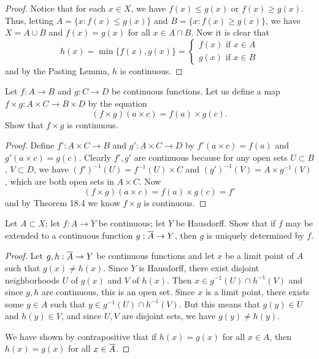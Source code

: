 \documentclass[11pt]{article}
\begin{document}
\begin{proof}
  Notice that for each $x \in X$, we have $f(x) \leq g(x)$ or $f(x) \geq g(x)$.
  Thus, letting $A = \{x: f(x) \leq g(x)\}$ and $B = \{x: f(x) \geq g(x)\}$,
  we have $X = A \cup B$ and $f(x) = g(x)$ for all $x \in A \cap B$. Now it is
  clear that
  \[
    h(x) = \min\{f(x), g(x)\} =
      \begin{cases}
        f(x) \text{ if } x \in A \\
        g(x) \text{ if } x \in B
      \end{cases}
  \]
  and by the Pasting Lemma, $h$ is continuous.
\end{proof}

\begin{ex}{18.10}
  Let $f: A \to B$ and $g: C \to D$ be continuous functions. Let us define a map
  $f \times g : A \times C \to B \times D$ by the equation
  \[ (f \times g)(a \times c) = f(a) \times g(c). \]
  Show that $f \times g$ is continuous.
\end{ex}

\begin{proof}
  Define $f': A \times C \to B$ and $g': A \times C \to D$ by $f'(a \times c) =
  f(a)$ and $g'(a \times c) = g(c)$. Clearly $f', g'$ are continuous because for
  any open sets $U \subset B$, $V \subset D$, we have $(f')^{-1}(U) = f^{-1}(U)
  \times C$ and $(g')^{-1}(V) = A \times g^{-1}(V)$, which are both open sets in
  $A \times C$. Now
  \[ (f \times g)(a \times c) = f(a) \times g(c) = f' \]
  and by Theorem 18.4 we know $f \times g$ is continuous.
\end{proof}

\begin{ex}{18.13}
  Let $A \subset X$; let $f : A \to Y$ be continuous; let $Y$ be Hausdorff. Show
  that if $f$ may be extended to a continuous function $g : { \overline{A} } \to Y$, then
  $g$ is uniquely determined by $f$.
\end{ex}

\begin{proof}
  Let $g, h: { \overline{A} } \to Y$ be continuous functions and let $x$ be a limit point
  of $A$ such that $g(x) \neq h(x)$. Since $Y$ is Hausdorff, there exist
  disjoint neighborhoods $U$ of $g(x)$ and $V$ of $h(x)$. Then $x \in g^{-1}(U)
  \cap h^{-1}(V)$ and since $g, h$ are continuous, this is an open set. Since
  $x$ is a limit point, there exists some $y \in A$ such that $y \in g^{-1}(U)
  \cap h^{-1}(V)$. But this means that $g(y) \in U$ and $h(y) \in V$, and since
  $U, V$ are disjoint sets, we have $g(y) \neq h(y)$.

  We have shown by contrapositive that if $h(x) = g(x)$ for all $x \in A$,
  then $h(x) = g(x)$ for all $x \in { \overline{A} }$.
\end{proof}
\end{document}
